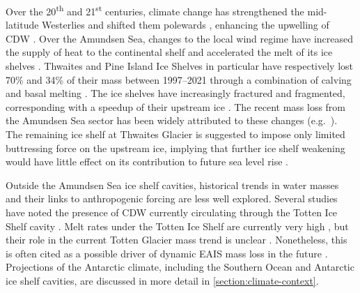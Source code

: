 Over the 20\textsuperscript{th} and 21\textsuperscript{st} centuries, climate change has strengthened the mid-latitude Westerlies and shifted them polewards \citep{goyalHistoricalProjectedChanges2021}, enhancing the upwelling of CDW \citep{spenceRapidSubsurfaceWarming2014,wangWaterMassesSouthern2025}. Over the Amundsen Sea, changes to the local wind regime have increased the supply of heat to the continental shelf and accelerated the melt of its ice shelves \citep{hollandAnthropogenicInternalDrivers2022,naughtenSimulatedTwentiethCenturyOcean2022}. Thwaites and Pine Island Ice Shelves in particular have respectively lost 70\% and 34\% of their mass between 1997--2021 through a combination of calving and basal melting \citep{davisonAnnualMassBudget2023}. The ice shelves have increasingly fractured and fragmented, corresponding with a speedup of their upstream ice \citep{lhermitteDamageAcceleratesIce2020,joughinIceshelfRetreatDrives2021,sunSpeedupPineIsland2023,surawy-stepneyEpisodicDynamicChange2023}. The recent mass loss from the Amundsen Sea sector has been widely attributed to these changes (e.g.~\citealt{gudmundssonInstantaneousAntarcticIce2019,bettModellingEvolutionThwaites2026}). The remaining ice shelf at Thwaites Glacier is suggested to impose only limited buttressing force on the upstream ice, implying that further ice shelf weakening would have little effect on its contribution to future sea level rise \citep{gudmundssonLimitedImpactThwaites2023}.

Outside the Amundsen Sea ice shelf cavities, historical trends in water masses and their links to anthropogenic forcing are less well explored. Several studies have noted the presence of CDW currently circulating through the Totten Ice Shelf cavity \citep{rintoulOceanHeatDrives2016,hiranoOnshelfCirculationWarm2023}. Melt rates under the Totten Ice Shelf are currently very high \citep{adusumilliInterannualVariationsMeltwater2020}, but their role in the current Totten Glacier mass trend is unclear \citep{milesTottenIceShelf2025}. Nonetheless, this is often cited as a possible driver of dynamic EAIS mass loss in the future \citep{stokesResponseEastAntarctic2022}. Projections of the Antarctic climate, including the Southern Ocean and Antarctic ice shelf cavities, are discussed in more detail in \cref{section:climate-context}.


